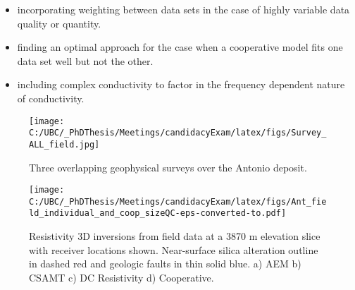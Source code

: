 \documentclass[letterpaper,11pt]{article}
\begin{document}
\begin{itemize}
\item incorporating weighting between data sets in the case of highly variable data quality or quantity.
\item finding an optimal approach for the case when a cooperative model fits one data set well but not the other.
\item including complex conductivity to factor in the frequency dependent nature of conductivity.
\end{itemize}

\clearpage

\begin{figure}[h]
  \centering
    \begin{minipage}{.45\textwidth}
  \centering
  \texttt{[image: C:/UBC/\_PhDThesis/Meetings/candidacyExam/latex/figs/Survey\_ALL\_field.jpg]}
  \caption{Three overlapping geophysical \newline surveys over the Antonio deposit.}
  \label{fig:AntonioSurveys}
    \end{minipage}
    \begin{minipage}{.45\textwidth}
  \centering
  \texttt{[image: C:/UBC/\_PhDThesis/Meetings/candidacyExam/latex/figs/Ant\_field\_individual\_and\_coop\_sizeQC-eps-converted-to.pdf]}
  \caption{Resistivity 3D inversions from field data at a 3870 m elevation slice with receiver locations shown. Near-surface silica alteration outline in dashed red and geologic faults in thin solid blue. a) AEM b) CSAMT c) DC Resistivity d) Cooperative.}
  \label{fig:CoopFieldInversions}
  \end{minipage}
\end{figure}



\newpage
\end{document}
